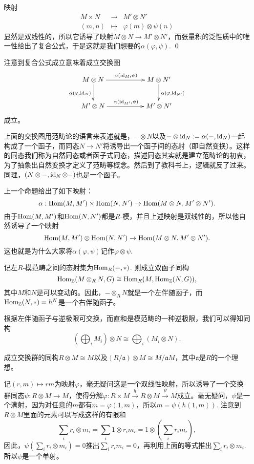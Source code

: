 \proof
	映射
	\[
	\begin{array}{ccc}
		M\times N&\to& M'\otimes N'\\
		(m,n)&\mapsto& \varphi(m)\otimes \psi(n)
	\end{array}
	\]
	显然是双线性的，所以它诱导了映射$M\otimes N\to M'\otimes N'$，而张量积的泛性质中的唯一性给出了复合公式，于是这就是我们想要的$\alpha(\varphi,\psi)$.
\qed

注意到复合公式成立意味着成立交换图
\[
\begin{xy}
	\xymatrix
	{
		M\otimes N\ar[rr]^{\alpha(\id_M,\psi)}\ar[d]_{\alpha(\varphi,\id_{N})}&&M\otimes N'\ar[d]^{\alpha(\varphi,\id_{N'})}\\
		M'\otimes N\ar[rr]^{\alpha(\id_{M'},\psi)}&&M'\otimes N'
	}
\end{xy}
\]
成立。

上面的交换图用范畴论的语言来表述就是，$-\otimes N$以及$-\otimes \operatorname{id}_N:=\alpha(-,\operatorname{id}_N)$一起构成了一个函子，而同态$N\to N'$将诱导出一个函子间的态射（即自然变换）。这样的同态我们称为自然同态或者函子式同态，描述同态其实就是建立范畴论的初衷，为了抽象出自然变换才定义了范畴等概念。然后到了教科书上，逻辑就反了过来。同理，$(N\otimes -,\operatorname{id}_N\otimes -)$也是一个函子。

\para 上一个命题给出了如下映射：
\[
	\alpha:\operatorname{Hom}(M,M')\times \operatorname{Hom}(N,N')\to \operatorname{Hom}(M\otimes N,M'\otimes N').
\]
由于$\operatorname{Hom}(M,M')$和$\operatorname{Hom}(N,N')$都是$R$-模，并且上述映射是双线性的，所以他自然诱导了一个映射
\[
	\operatorname{Hom}(M,M')\otimes \operatorname{Hom}(N,N')\to \operatorname{Hom}(M\otimes N,M'\otimes N').
\]
这也就是为什么大家将$\alpha(\varphi,\psi)$记作$\varphi\otimes \psi$. 

\pro 记左$R$-模范畴之间的态射集为$\operatorname{Hom}_R(-,*)$. 则成立双函子同构
\[
	\operatorname{Hom}_{\mathbb{Z}}(M\otimes_R N,G)\cong \operatorname{Hom}_R(M,\operatorname{Hom}_\mathbb{Z}(N,G)),
\]
其中$M$和$N$是可以变动的。因此，$-\otimes_R N$就是一个左伴随函子，而$\operatorname{Hom}_\mathbb{Z}(N,*)=h^N$是一个右伴随函子。\notprove

根据左伴随函子与逆极限可交换，而直和是模范畴的一种逆极限，我们可以得知同构
\[
	\left(\bigoplus_i M_i\right)\otimes N\cong \bigoplus_i \left(M_i\otimes N\right).
\]

\pro 成立交换群的同构$R\otimes M\cong M$以及$(R/\mathfrak{a})\otimes M\cong M/\mathfrak{a}M$，其中$\mathfrak{a}$是$R$的一个理想。

\proof
	记$(r,m)\mapsto rm$为映射$\varphi$，毫无疑问这是一个双线性映射，所以诱导了一个交换群同态$\psi:R\otimes M\to M$，使得分解$\varphi:R\times M\xrightarrow{h} R\otimes M\xrightarrow{\psi} M$成立。毫无疑问，$\psi$是一个满射，因为对任意的$m$都有$m=\varphi(1,m)$，所以$m=\psi(h(1,m))$. 注意到$R\otimes M$里面的元素可以写成这样的有限和
	\[
	\sum_i r_i\otimes m_i=\sum_i 1\otimes r_im_i=1\otimes \left(\sum_i r_i m_i\right),
	\]
	因此，$\psi\left(\sum_i r_i\otimes m_i\right)=0$推出$\sum_i r_i m_i=0$，再利用上面的等式推出$\sum_i r_i\otimes m_i$. 所以$\psi$是一个单射。

